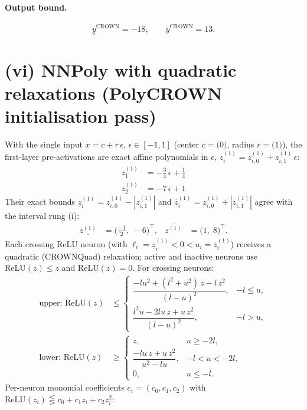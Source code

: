 \documentclass[11pt]{article}
\begin{document}
\paragraph{Output bound.}
\begin{equation*}
\underline{y}^{\text{CROWN}} = -18, \qquad \overline{y}^{\text{CROWN}} = 13.
\end{equation*}

\section{(vi) NNPoly with quadratic relaxations (PolyCROWN initialisation pass)}
With the single input $x = c + r\,\epsilon$, $\epsilon \in [-1, 1]$ (center $c = \bigl(0\bigr)$, radius $r = \bigl(1\bigr)$), the first-layer pre-activations are exact affine polynomials in $\epsilon$, $z^{(1)}_i = z^{(1)}_{i,0} + z^{(1)}_{i,1}\,\epsilon$:
\begin{align*}
z^{(1)}_{1} &= -\frac{3}{4}\,\epsilon + \frac{1}{4} \\
z^{(1)}_{2} &= -7\,\epsilon + 1
\end{align*}
Their exact bounds $\underline{z}^{(1)}_i = z^{(1)}_{i,0} - |z^{(1)}_{i,1}|$ and $\overline{z}^{(1)}_i = z^{(1)}_{i,0} + |z^{(1)}_{i,1}|$ agree with the interval rung (i):
\begin{align*}
\underline{z^{(1)}} &= \bigl(\frac{-1}{2},\; -6\bigr)^{\!\top}, & \overline{z^{(1)}} &= \bigl(1,\; 8\bigr)^{\!\top}.
\end{align*}
Each crossing ReLU neuron (with $\ell_i = \underline{z}^{(1)}_i < 0 < u_i = \overline{z}^{(1)}_i$)
receives a quadratic (CROWNQuad) relaxation; active and inactive neurons use $\mathrm{ReLU}(z) \le z$
and $\mathrm{ReLU}(z) = 0$. For crossing neurons:
\begin{align*}
\text{upper: } \mathrm{ReLU}(z) &\le \begin{cases} \dfrac{-l u^2 + (l^2 + u^2)\, z - l\, z^2}{(l - u)^2}, & -l \le u, \\[3mm] \dfrac{l^2 u - 2 l u\, z + u\, z^2}{(l - u)^2}, & -l > u, \end{cases} \\[2mm]
\text{lower: } \mathrm{ReLU}(z) &\ge \begin{cases} z, & u \ge -2l, \\[3mm] \dfrac{-l u\, z + u\, z^2}{u^2 - l u}, & -l < u < -2l, \\[3mm] 0, & u \le -l. \end{cases}
\end{align*}
Per-neuron monomial coefficients $c_i = (c_0, c_1, c_2)$ with $\mathrm{ReLU}(z_i) \lesseqgtr c_0 + c_1 z_i + c_2 z_i^2$:
\end{document}
